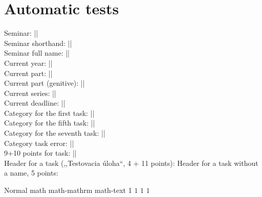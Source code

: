 \newpage
\chapter{\Huge Automatic tests}
    Seminar: |\seminarID|\\
    Seminar shorthand: |\seminarShort|\\
    Seminar full name: |\seminarFull|\\
    
    Current year: |\currentYear|\\
    Current part: |\currentPart|\\
    Current part (genitive): |\currentPartGenitive|\\
    Current series: |\currentSeries|\\        
    Current deadline: |\currentDeadline|\\
    
    Category for the first task: ||\\
    Category for the fifth task: ||\\
    Category for the seventh task: ||\\
    Category task error: ||\\
    
    9+10 points for task: |\formatTaskPoints[9][10]|\\
    Header for a task (,,Testovacia úloha``, 4 + 11 points): 
    Header for a task without a name, 5 points: \createTaskHeader[][5][]
    
    Normal math math-mathrm math-text
    1 $1$ $\mathrm{1}$ $\text{1}$
    
    
